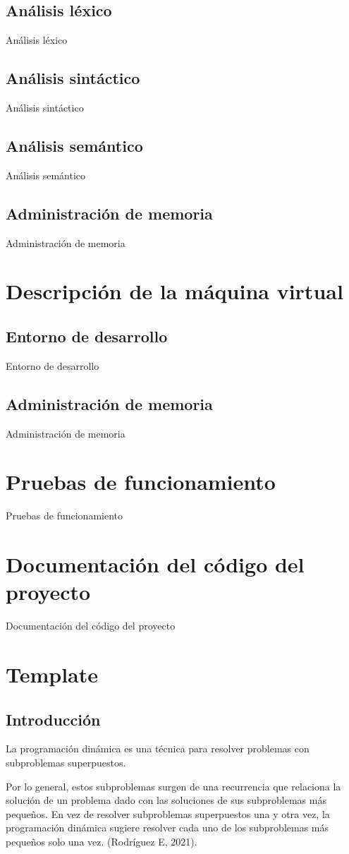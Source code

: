 \documentclass[12pt,letterpaper, titlepage, onecolumn]{article}
\begin{document}
	\subsection{Análisis léxico}
	Análisis léxico
	\subsection{Análisis sintáctico}
	Análisis sintáctico
	\subsection{Análisis semántico}
	Análisis semántico
	\subsection{Administración de memoria}
	Administración de memoria

\section{Descripción de la máquina virtual}
	\subsection{Entorno de desarrollo}
	Entorno de desarrollo
	\subsection{Administración de memoria}
	Administración de memoria
	
\section{Pruebas de funcionamiento}
Pruebas de funcionamiento

\section{Documentación del código del proyecto}
Documentación del código del proyecto



\section{Template}
\appendix
\subsection{Introducción}		
La programación dinámica es una técnica para resolver problemas con subproblemas 
superpuestos.\\
\par\indent Por lo general, estos subproblemas surgen de una recurrencia que relaciona la 
solución de un problema dado con las soluciones de sus subproblemas más pequeños.
En vez de resolver subproblemas superpuestos una y otra vez, la programación 
dinámica sugiere resolver cada uno de los subproblemas más pequeños solo una vez. (Rodríguez E, 2021).
	
\end{document}
